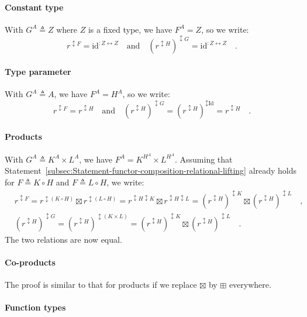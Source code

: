 \paragraph{Constant type}

With $G^{A}\triangleq Z$ where $Z$ is a fixed type, we have $F^{A}=Z$,
so we write:
\[
r^{\updownarrow F}=\text{id}^{:Z\leftrightarrow Z}\quad\text{and}\quad(r^{\updownarrow H})^{\updownarrow G}=\text{id}^{:Z\leftrightarrow Z}\quad.
\]


\paragraph{Type parameter}

With $G^{A}\triangleq A$, we have $F^{A}=H^{A}$, so we write:
\[
r^{\updownarrow F}=r^{\updownarrow H}\quad\text{and}\quad(r^{\updownarrow H})^{\updownarrow G}=(r^{\updownarrow H})^{\updownarrow\text{Id}}=r^{\updownarrow H}\quad.
\]


\paragraph{Products}

With $G^{A}\triangleq K^{A}\times L^{A}$, we have $F^{A}=K^{H^{A}}\times L^{H^{A}}$.
Assuming that Statement~\ref{subsec:Statement-functor-composition-relational-lifting}
already holds for $F\triangleq K\circ H$ and $F\triangleq L\circ H$,
we write:
\begin{align*}
 & r^{\updownarrow F}=r^{\updownarrow(K\circ H)}\boxtimes r^{\updownarrow(L\circ H)}=r^{\updownarrow H\updownarrow K}\boxtimes r^{\updownarrow H\updownarrow L}=(r^{\updownarrow H})^{\updownarrow K}\boxtimes(r^{\updownarrow H})^{\updownarrow L}\quad,\\
 & (r^{\updownarrow H})^{\updownarrow G}=(r^{\updownarrow H})^{\updownarrow(K\times L)}=(r^{\updownarrow H})^{\updownarrow K}\boxtimes(r^{\updownarrow H})^{\updownarrow L}\quad.
\end{align*}
The two relations are now equal.

\paragraph{Co-products}

The proof is similar to that for products if we replace $\boxtimes$
by $\boxplus$ everywhere.

\paragraph{Function types}

